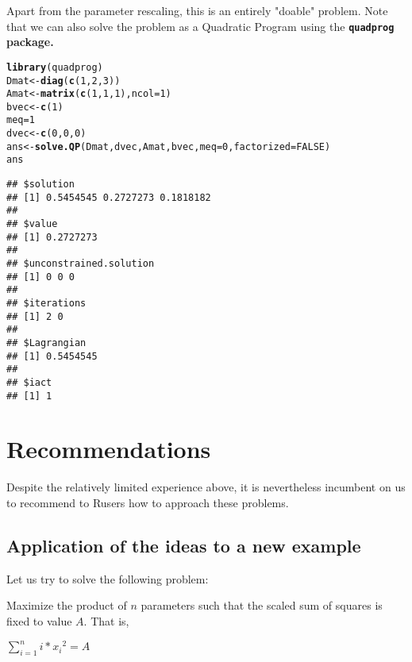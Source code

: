 \documentclass[11pt]{article}\usepackage[]{graphicx}\usepackage[]{color}
\makeatletter
\newcommand{\hlnum}[1]{\textcolor[rgb]{0.686,0.059,0.569}{#1}}%
\newcommand{\hlstd}[1]{\textcolor[rgb]{0.345,0.345,0.345}{#1}}%
\newcommand{\hlkwb}[1]{\textcolor[rgb]{0.69,0.353,0.396}{#1}}%
\newcommand{\hlkwc}[1]{\textcolor[rgb]{0.333,0.667,0.333}{#1}}%
\newcommand{\hlkwd}[1]{\textcolor[rgb]{0.737,0.353,0.396}{\textbf{#1}}}%
\newenvironment{kframe}{%
 \def\at@end@of@kframe{}%
 \ifinner\ifhmode%
  \def\at@end@of@kframe{\end{minipage}}%
  \begin{minipage}{\columnwidth}%
 \fi\fi%
 \def\FrameCommand##1{\hskip\@totalleftmargin \hskip-\fboxsep
 \colorbox{shadecolor}{##1}\hskip-\fboxsep
     \hskip-\linewidth \hskip-\@totalleftmargin \hskip\columnwidth}%
 \MakeFramed {\advance\hsize-\width
   \@totalleftmargin\z@ \linewidth\hsize
   \@setminipage}}%
 {\par\unskip\endMakeFramed%
 \at@end@of@kframe}
\newenvironment{knitrout}{}{} %
\newcommand{\R}{{\sf R}}
\newcommand{\pkg}[1]{\bf{\tt#1}\rm }
\makeatother
\begin{document}
Apart from the parameter rescaling, this is an entirely "doable" problem. 
Note that we can also solve the problem as a Quadratic Program using
the \pkg{quadprog} package.

\begin{knitrout}\scriptsize
{}\color{fgcolor}\begin{kframe}
\begin{alltt}
\hlkwd{library}\hlstd{(quadprog)}
\hlstd{Dmat}\hlkwb{<-}\hlkwd{diag}\hlstd{(}\hlkwd{c}\hlstd{(}\hlnum{1}\hlstd{,}\hlnum{2}\hlstd{,}\hlnum{3}\hlstd{))}
\hlstd{Amat}\hlkwb{<-}\hlkwd{matrix}\hlstd{(}\hlkwd{c}\hlstd{(}\hlnum{1}\hlstd{,} \hlnum{1}\hlstd{,} \hlnum{1}\hlstd{),} \hlkwc{ncol}\hlstd{=}\hlnum{1}\hlstd{)}
\hlstd{bvec}\hlkwb{<-}\hlkwd{c}\hlstd{(}\hlnum{1}\hlstd{)}
\hlstd{meq}\hlkwb{=}\hlnum{1}
\hlstd{dvec}\hlkwb{<-}\hlkwd{c}\hlstd{(}\hlnum{0}\hlstd{,} \hlnum{0}\hlstd{,} \hlnum{0}\hlstd{)}
\hlstd{ans}\hlkwb{<-}\hlkwd{solve.QP}\hlstd{(Dmat, dvec, Amat, bvec,} \hlkwc{meq}\hlstd{=}\hlnum{0}\hlstd{,} \hlkwc{factorized}\hlstd{=}\hlnum{FALSE}\hlstd{)}
\hlstd{ans}
\end{alltt}
\begin{verbatim}
## $solution
## [1] 0.5454545 0.2727273 0.1818182
## 
## $value
## [1] 0.2727273
## 
## $unconstrained.solution
## [1] 0 0 0
## 
## $iterations
## [1] 2 0
## 
## $Lagrangian
## [1] 0.5454545
## 
## $iact
## [1] 1
\end{verbatim}
\end{kframe}
\end{knitrout}

\section{Recommendations}

Despite the relatively limited experience above, it is nevertheless incumbent on us to 
recommend to \R users how to approach these problems. 

\subsection{Application of the ideas to a new example}

Let us try to solve the following problem:

Maximize the product of $n$ parameters such that the scaled sum of squares is fixed to value $A$.
That is, 

$\sum_{i=1}^n{i*{x_i}^2} = A $
\end{document}
